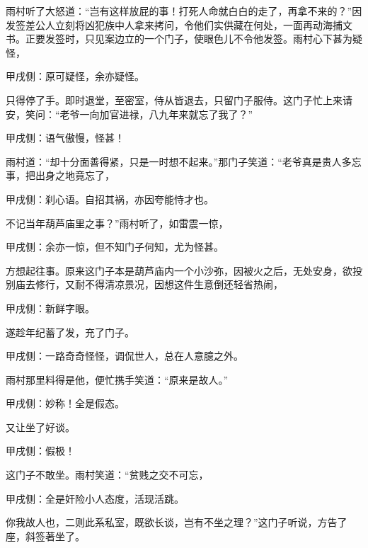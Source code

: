 \begin{parag}
    雨村听了大怒道：“岂有这样放屁的事！打死人命就白白的走了，再拿不来的？”因发签差公人立刻将凶犯族中人拿来拷问，令他们实供藏在何处，一面再动海捕文书。正要发签时，只见案边立的一个门子，使眼色儿不令他发签。雨村心下甚为疑怪，\begin{note}甲戌侧：原可疑怪，余亦疑怪。\end{note}只得停了手。即时退堂，至密室，侍从皆退去，只留门子服侍。这门子忙上来请安，笑问：“老爷一向加官进禄，八九年来就忘了我了？”\begin{note}甲戌侧：语气傲慢，怪甚！\end{note}雨村道：“却十分面善得紧，只是一时想不起来。”那门子笑道：“老爷真是贵人多忘事，把出身之地竟忘了，\begin{note}甲戌侧：刹心语。自招其祸，亦因夸能恃才也。\end{note}不记当年葫芦庙里之事？”雨村听了，如雷震一惊，\begin{note}甲戌侧：余亦一惊，但不知门子何知，尤为怪甚。\end{note}方想起往事。原来这门子本是葫芦庙内一个小沙弥，因被火之后，无处安身，欲投别庙去修行，又耐不得清凉景况，因想这件生意倒还轻省热闹，\begin{note}甲戌侧：新鲜字眼。\end{note}遂趁年纪蓄了发，充了门子。\begin{note}甲戌侧：一路奇奇怪怪，调侃世人，总在人意臆之外。\end{note}雨村那里料得是他，便忙携手笑道：“原来是故人。”\begin{note}甲戌侧：妙称！全是假态。\end{note}又让坐了好谈。\begin{note}甲戌侧：假极！\end{note}这门子不敢坐。雨村笑道：“贫贱之交不可忘，\begin{note}甲戌侧：全是奸险小人态度，活现活跳。\end{note}你我故人也，二则此系私室，既欲长谈，岂有不坐之理？”这门子听说，方告了座，斜签著坐了。
\end{parag}


